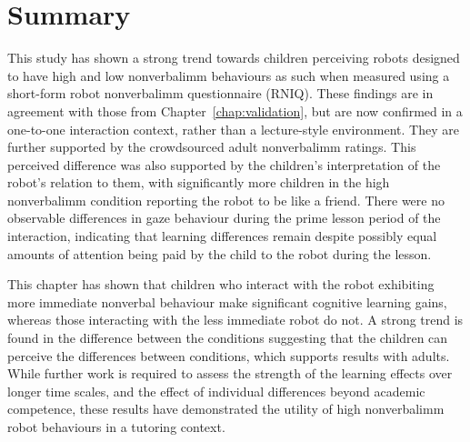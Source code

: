 \section{Summary}\label{sec:nviprimes-summary}
This study has shown a strong trend towards children perceiving robots designed to have high and low \gls{nonverbalimm} behaviours as such when measured using a short-form robot \gls{nonverbalimm} questionnaire (RNIQ). These findings are in agreement with those from Chapter~\ref{chap:validation}, but are now confirmed in a one-to-one interaction context, rather than a lecture-style environment. They are further supported by the crowdsourced adult \gls{nonverbalimm} ratings. This perceived difference was also supported by the children's interpretation of the robot's relation to them, with significantly more children in the high \gls{nonverbalimm} condition reporting the robot to be like a friend. There were no observable differences in gaze behaviour during the prime lesson period of the interaction, indicating that \gls{learning} differences remain despite possibly equal amounts of attention being paid by the child to the robot during the lesson.

This chapter has shown that children who interact with the robot exhibiting more immediate nonverbal behaviour make significant cognitive \gls{learning} gains, whereas those interacting with the less immediate robot do not. A strong trend is found in the difference between the conditions suggesting that the children can perceive the differences between conditions, which supports results with adults. While further work is required to assess the strength of the \gls{learning} effects over longer time scales, and the effect of individual differences beyond academic competence, these results have demonstrated the utility of high \gls{nonverbalimm} robot behaviours in a tutoring context.